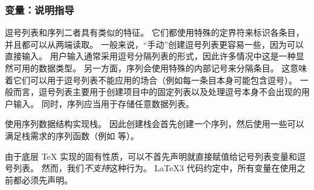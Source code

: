 \documentclass{l3doc}
\begin{document}
%
\subsubsection{变量：说明指导}

%
逗号列表和序列二者具有类似的特征。
它们都使用特殊的定界符来标识各条目，并且都可以从两端读取。
一般来说，“手动”创建逗号列表更容易一些，因为可以直接输入。
用户输入通常采用逗号分隔列表的形式，因此许多情况中这是一种显然可用的数据类型。
另一方面，序列会使用特殊的内部记号来分隔条目。
这意味着它们可以用于逗号列表不能应用的场合（例如每一条目本身可能包含逗号）。
一般而言，逗号列表主要用于创建项目中的固定列表以及处理逗号本身不会出现的用户输入。
同时，序列应当用于存储任意数据列表。

%

 使用序列数据结构实现栈。
因此创建栈会首先创建一个序列，然后使用一些可以满足栈需求的序列函数（例如  等）。

%
由于底层 \TeX{} 实现的固有性质，可以不首先声明就直接赋值给记号列表变量和逗号列表。
然而，我们\emph{不支持}这种行为。
\LaTeX3 代码约定中，所有变量在使用之前都必须先声明。
\end{document}
